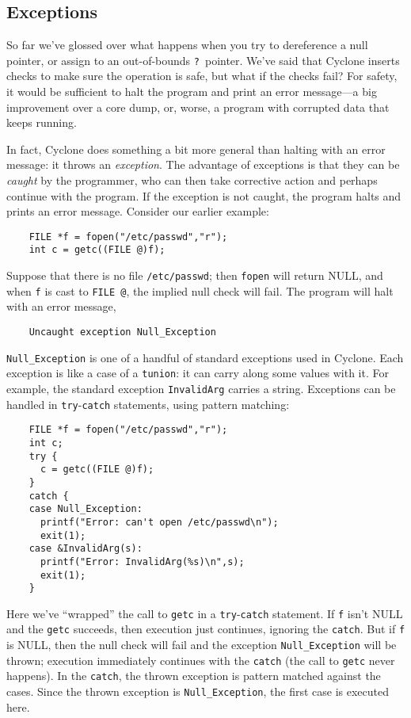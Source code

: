 \subsection{Exceptions}

So far we've glossed over what happens when you try to dereference a
null pointer, or assign to an out-of-bounds \texttt{?}\ pointer.
We've said that Cyclone inserts checks to make sure the operation is
safe, but what if the checks fail?  For safety, it would be sufficient
to halt the program and print an error message---a big improvement
over a core dump, or, worse, a program with corrupted data that keeps
running.

In fact, Cyclone does something a bit more general than halting with
an error message: it throws an \emph{exception}.  The advantage of
exceptions is that they can be \emph{caught} by the programmer, who
can then take corrective action and perhaps continue with the program.
If the exception is not caught, the program halts and prints an error
message.  Consider our earlier example:
\begin{verbatim}
    FILE *f = fopen("/etc/passwd","r");
    int c = getc((FILE @)f);
\end{verbatim}
Suppose that there is no file \texttt{/etc/passwd}; then
\texttt{fopen} will return NULL, and when \texttt{f} is cast to
\texttt{FILE @}, the implied null check will fail.  The program will
halt with an error message,
\begin{verbatim}
    Uncaught exception Null_Exception
\end{verbatim}
\texttt{Null_Exception} is one of a handful of standard exceptions
used in Cyclone.  Each exception is like a case of a \texttt{tunion}:
it can carry along some values with it.  For example, the standard
exception \texttt{InvalidArg} carries a string.  Exceptions can be
handled in \texttt{try}-\texttt{catch} statements, using pattern
matching:
\begin{verbatim}
    FILE *f = fopen("/etc/passwd","r");
    int c;
    try {
      c = getc((FILE @)f);
    }
    catch {
    case Null_Exception:
      printf("Error: can't open /etc/passwd\n");
      exit(1);
    case &InvalidArg(s):
      printf("Error: InvalidArg(%s)\n",s);
      exit(1);
    }
\end{verbatim}
Here we've ``wrapped'' the call to \texttt{getc} in a
\texttt{try}-\texttt{catch} statement.  If \texttt{f} isn't NULL and
the \texttt{getc} succeeds, then execution just continues, ignoring
the \texttt{catch}.  But if \texttt{f} is NULL, then the null check
will fail and the exception \texttt{Null_Exception} will be thrown;
execution immediately continues with the \texttt{catch} (the call to
\texttt{getc} never happens).  In the \texttt{catch}, the thrown
exception is pattern matched against the cases.  Since the thrown
exception is \texttt{Null_Exception}, the first case is executed here.

